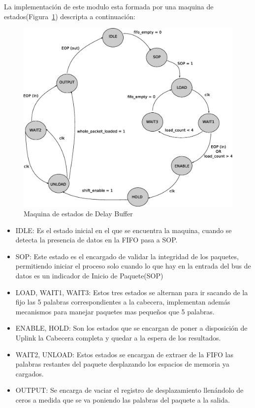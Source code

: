 La implementación de este modulo esta formada por una maquina de estados(Figura~\ref{fig:dbstate}) descripta a continuación:

\begin{figure}[H]
  \centering
	\includegraphics[scale=0.50]{3-arquitectura/graf/estdelaycompleto.eps}
  \caption{Maquina de estados de Delay Buffer}
  \label{fig:dbstate}
\end{figure}

\begin{itemize}
	\item IDLE: Es el estado inicial en el que se encuentra la maquina, cuando se detecta la presencia de datos en la FIFO pasa a SOP.
	\item SOP: Este estado es el encargado de validar la integridad de los paquetes, permitiendo iniciar el proceso solo cuando lo que hay en la entrada del bus de datos es un indicador de Inicio de Paquete(SOP)
	\item LOAD, WAIT1, WAIT3: Estos tres estados se alternan para ir sacando de la fijo las 5 palabras correspondientes a la cabecera, implementan además mecanismos para manejar paquetes mas pequeños que 5 palabras.
	\item ENABLE, HOLD: Son los estados que se encargan de poner a disposición de Uplink la Cabecera completa y quedar a la espera de los resultados.
	\item WAIT2, UNLOAD: Estos estados se encargan de extraer de la FIFO las palabras restantes del paquete desplazando los espacios de memoria ya cargados. 
	\item OUTPUT: Se encarga de vaciar el registro de desplazamiento llenándolo de ceros a medida que se va poniendo las palabras del paquete a la salida. 
\end{itemize}

